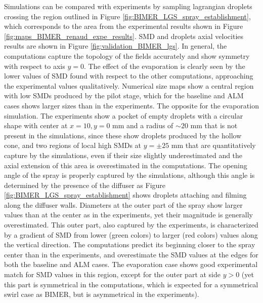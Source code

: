 Simulations can be compared with experiments by sampling lagrangian droplets crossing the region outlined in Figure \ref{fig:BIMER_LGS_spray_establishment}, which corresponds to the area from the experimental results shown in Figure \ref{fig:maps_BIMER_renaud_expe_results}. SMD and droplets axial velocities results are shown in Figure \ref{fig:validation_BIMER_lgs}. In general, the computations capture the topology of the fields accurately and show symmetry with respect to axis $y = 0$. The effect of the evaporation is clearly seen by the lower values of SMD found with respect to the other computations, approaching the experimental values qualitatively. Numerical size maps show a central region with low SMDs produced by the pilot stage, which for the baseline and ALM cases shows larger sizes than in the experiments. The opposite for the evaporation simulation. The experiments show a pocket of empty droplets with a circular shape with center at $x = 10, y = 0$ mm and a radius of $\sim 20$ mm that is not present in the simulations, since these show droplets produced by the hollow cone, and two regions of local high SMDs at $y = \pm 25$ mm that are quantitatively capture by the simulations, even if their size slightly underestimated and the axial extension of this area is overestimated in the computations. The opening angle of the spray is properly captured by the simulations, although this angle is determined by the presence of the diffuser as Figure \ref{fig:BIMER_LGS_spray_establishment} shows droplets attaching and filming along the diffuser walls. Diameters at the outer part of the spray show larger values than at the center as in the experiments, yet their magnitude is generally overestimated. This outer part, also captured by the experiments, is characterized by a gradient of SMD from lower (green colors) to larger (red colors) values along the vertical direction. The computations predict its beginning closer to the spray center than in the experiments, and overestimate the SMD values at the edges for both the baseline and ALM cases. The evaporation case shows good experimental match for SMD values in this region, except for the outer part at side $y > 0$ (yet this part is symmetrical in the computations, which is expected for a symmetrical swirl case as BIMER, but is asymmetrical in the experiments). 



